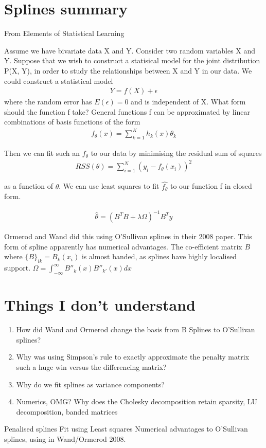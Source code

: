 \documentclass{amsart}
\begin{document}
\section{Splines summary}
From Elements of Statistical Learning

Assume we have bivariate data X and Y. Consider two random variables X and Y.
Suppose that we wish to construct a statisical model for the joint distribution 
P(X, Y), in order to study the relationships between X and Y in our data. We
could construct a statistical model
\begin{align*}
	Y = f(X) + \epsilon	
\end{align*}
where the random error has $E(\epsilon) = 0$ and is independent of X. What form
should the function f take? General functions f can be approximated by linear
combinations of basis functions of the form
\begin{align*}
	f_\theta(x) = \sum_{k=1}^K h_k(x) \theta_k
\end{align*}

Then we can fit such an $f_\theta$ to our data by minimising the residual
sum of squares
\begin{align*}
	RSS(\theta) = \sum_{i=1}^N (y_i - f_\theta(x_i))^2
\end{align*}

as a function of $\theta$. We can use least squares %
to fit $\hat{f_{\theta}}$ to our function f in closed form.

\begin{align*}
	\hat{\theta} = (B^TB + \lambda \Omega)^{-1}B^T y
\end{align*}

Ormerod and Wand did this using O'Sullivan splines in their 2008 paper. This
form of spline apparently has numerical advantages. The co-efficient matrix
$B$ where $\{B\}_{ik} = B_{k}(x_i)$ is
almost banded, as splines have highly localised support.
$\Omega = \int_{-\infty}^{\infty} B''_{k}(x) B''_{k'}(x) dx$

\section{Things I don't understand}
\begin{enumerate}
	\item How did Wand and Ormerod change the basis from B Splines to O'Sullivan
	splines?
	\item Why was using Simpson's rule to exactly approximate the penalty matrix
	such a huge win versus the differencing matrix?
	\item Why do we fit splines as variance components?
	\item Numerics, OMG? Why does the Cholesky decomposition retain sparsity,
	LU decomposition, banded matrices
\end{enumerate}

Penalised splines
Fit using Least squares
Numerical advantages to O'Sullivan splines, using in Wand/Ormerod 2008.
\end{document}
